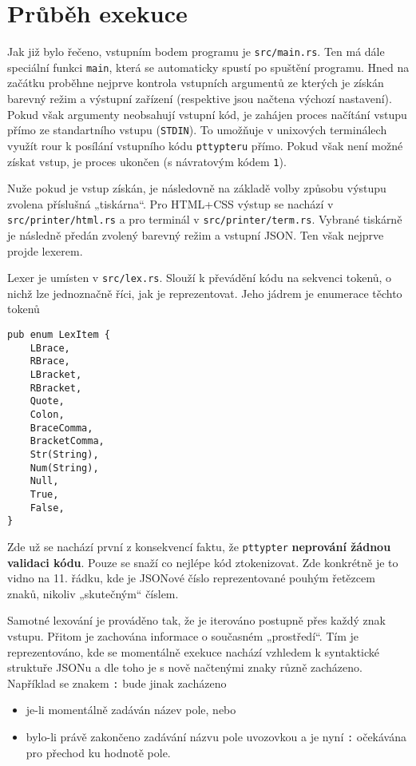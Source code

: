 \documentclass[11pt, letterpaper]{article}
\begin{document}
\section{Průběh exekuce}
Jak již bylo řečeno, vstupním bodem programu je \texttt{src/main.rs}. Ten má dále speciální funkci \texttt{main}, která se automaticky spustí po spuštění programu. Hned na začátku proběhne nejprve kontrola vstupních argumentů ze kterých je získán barevný režim a výstupní zařízení (respektive jsou načtena výchozí nastavení). Pokud však argumenty neobsahují vstupní kód, je zahájen proces načítání vstupu přímo ze standartního vstupu (\texttt{STDIN}). To umožňuje v unixových terminálech využít rour k posílání vstupního kódu \texttt{pttypteru} přímo. Pokud však není možné získat vstup, je proces ukončen (s návratovým kódem \texttt{1}).

Nuže pokud je vstup získán, je následovně na základě volby způsobu výstupu zvolena příslušná „tiskárna“. Pro HTML+CSS výstup se nachází v \texttt{src/printer/html.rs} a pro terminál v \texttt{src/printer/term.rs}. Vybrané tiskárně je následně předán zvolený barevný režim a vstupní JSON. Ten však nejprve projde lexerem.

Lexer je umísten v \texttt{src/lex.rs}. Slouží k převádění kódu na sekvenci tokenů, o nichž lze jednoznačně říci, jak je reprezentovat. Jeho jádrem je enumerace těchto tokenů
\begin{lstlisting}
pub enum LexItem {
    LBrace,
    RBrace,
    LBracket,
    RBracket,
    Quote,
    Colon,
    BraceComma,
    BracketComma,
    Str(String),
    Num(String),
    Null,
    True,
    False,
}
\end{lstlisting}

Zde už se nachází první z konsekvencí faktu, že \texttt{pttypter} \textbf{neprování žádnou validaci kódu}. Pouze se snaží co nejlépe kód ztokenizovat. Zde konkrétně je to vidno na 11. řádku, kde je JSONové číslo reprezentované pouhým řetězcem znaků, nikoliv „skutečným“ číslem.

Samotné lexování je prováděno tak, že je iterováno postupně přes každý znak vstupu. Přitom je zachována informace o současném „prostředí“. Tím je reprezentováno, kde se momentálně exekuce nachází vzhledem k syntaktické struktuře JSONu a dle toho je s nově načtenými znaky různě zacházeno. Například se znakem \texttt{:} bude jinak zacházeno
\begin{itemize}
    \item je-li momentálně zadáván název pole, nebo
    \item bylo-li právě zakončeno zadávání názvu pole uvozovkou a je nyní \texttt{:} očekávána pro přechod ku hodnotě pole.
\end{itemize}
\end{document}
